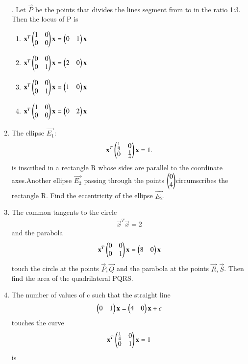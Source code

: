 \begin{enumerate}[label=\arabic*.,ref=\thesubsection.\theenumi]
\begin{align}
    \end{align}. Let $\vec{P}$ be the points that divides the lines segment from  to 	 in the ratio 1:3. Then the locus of P is 
    \begin{enumerate}
    \item $\mathbf{x}^T\begin{pmatrix}1 & 0 \\0 & 0\end{pmatrix}\mathbf{x}= \begin{pmatrix}0&1\end{pmatrix}\mathbf{x}$
    \item $\mathbf{x}^T \begin{pmatrix}0 & 0 \\0 & 1 \end{pmatrix} \mathbf{x}=\begin{pmatrix}2&0\end{pmatrix}\mathbf{x}$ 
    \item $\mathbf{x}^T\begin{pmatrix}0 & 0 \\0 & 1  \end{pmatrix} \mathbf{x}=\begin{pmatrix}1&0\end{pmatrix}\mathbf{x}$ 
    \item $\mathbf{x}^T \begin{pmatrix}1 & 0 \\0 & 0\end{pmatrix}\mathbf{x}= \begin{pmatrix}0&2\end{pmatrix}\mathbf{x}$ 
    \end{enumerate}
    \item The ellipse $\vec{E_1}$:
    \begin{align}\mathbf{x}^T\begin{pmatrix}\frac{1}{9} & 0 \\0 & \frac{1}{4}\end{pmatrix}\mathbf{x}=1.
    \end{align}is inscribed in a rectangle R whose sides are parallel to the coordinate axes.Another ellipse $\vec{E_2}$ passing through the points $\begin{pmatrix}0\\4\end{pmatrix} $circumscribes the rectangle R. Find the eccentricity of the ellipse $\vec{E_2}$.
    \item The common tangents to the circle 
    \begin{align}\vec{x}^T\vec{x}=2
    \end{align} and the parabola
    \begin{align}\mathbf{x}^T \begin{pmatrix}0 & 0 \\0 & 1\end{pmatrix} \mathbf{x}=\begin{pmatrix}8&0\end{pmatrix}\mathbf{x}
    \end{align} touch the circle at the points $\vec{P}, \vec{Q}$ and the parabola at the points 			$\vec{R},\vec{S}$. Then find the area of the quadrilateral PQRS.
    \item The number of values of c such that the straight line
    \begin{align}
    \begin{pmatrix}0&1\end{pmatrix}\mathbf{x}=\begin{pmatrix}4&0\end{pmatrix}\mathbf{x}+c
    \end{align} touches the curve
    \begin{align}
    \mathbf{x}^T\begin{pmatrix}\frac{1}{4}& 0 \\0 & 1\end{pmatrix} \mathbf{x}=1
    \end{align}is 

\end{enumerate}
